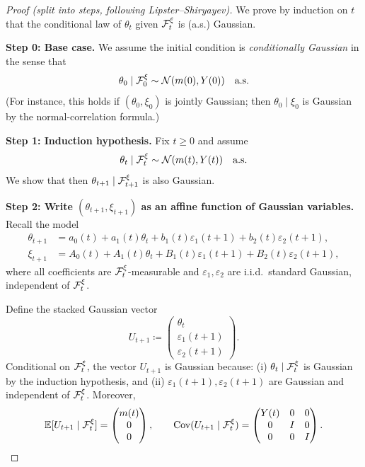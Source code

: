 \begin{proof}[Proof (split into steps, following Lipster--Shiryayev)]
We prove by induction on $t$ that the conditional law of $\theta_t$ given $\mathcal{F}_t^\xi$ is (a.s.) Gaussian.

\medskip
\noindent\textbf{Step 0: Base case.}
We assume the initial condition is \emph{conditionally Gaussian} in the sense that
\[
\theta_0 \mid \mathcal{F}_0^\xi \sim \mathcal{N}(m(0),Y(0)) \quad \text{a.s.}
\]
(For instance, this holds if $(\theta_0,\xi_0)$ is jointly Gaussian; then $\theta_0\mid \xi_0$
is Gaussian by the normal-correlation formula.)

\medskip
\noindent\textbf{Step 1: Induction hypothesis.}
Fix $t\ge 0$ and assume
\[
\theta_t \mid \mathcal{F}_t^\xi \sim \mathcal{N}(m(t),Y(t)) \quad \text{a.s.}
\]
We show that then $\theta_{t+1}\mid \mathcal{F}_{t+1}^\xi$ is also Gaussian.

\medskip
\noindent\textbf{Step 2: Write $(\theta_{t+1},\xi_{t+1})$ as an affine function of Gaussian variables.}
Recall the model
\begin{align*}
\theta_{t+1} &= a_0(t) + a_1(t)\theta_t + b_1(t)\varepsilon_1(t+1)+b_2(t)\varepsilon_2(t+1),\\
\xi_{t+1} &= A_0(t) + A_1(t)\theta_t + B_1(t)\varepsilon_1(t+1)+B_2(t)\varepsilon_2(t+1),
\end{align*}
where all coefficients are $\mathcal{F}_t^\xi$-measurable and $\varepsilon_1,\varepsilon_2$ are i.i.d.\ standard Gaussian,
independent of $\mathcal{F}_t^\xi$.

Define the stacked Gaussian vector
\[
U_{t+1}\coloneqq
\begin{pmatrix}
\theta_t\\ \varepsilon_1(t+1)\\ \varepsilon_2(t+1)
\end{pmatrix}.
\]
Conditional on $\mathcal{F}_t^\xi$, the vector $U_{t+1}$ is Gaussian because:
(i) $\theta_t\mid \mathcal{F}_t^\xi$ is Gaussian by the induction hypothesis, and
(ii) $\varepsilon_1(t+1),\varepsilon_2(t+1)$ are Gaussian and independent of $\mathcal{F}_t^\xi$.
Moreover,
\[
\mathbb{E}[U_{t+1}\mid \mathcal{F}_t^\xi]=
\begin{pmatrix}
m(t)\\ 0\\ 0
\end{pmatrix},
\qquad
\mathrm{Cov}(U_{t+1}\mid \mathcal{F}_t^\xi)=
\begin{pmatrix}
Y(t) & 0 & 0\\
0 & I & 0\\
0 & 0 & I
\end{pmatrix}.
\]


\end{proof}
